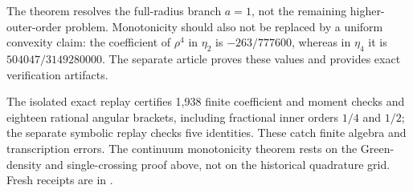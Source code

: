 \begin{remark}[Scope]
The theorem resolves the full-radius branch $a=1$, not the remaining
higher-outer-order problem. Monotonicity should also not be replaced
by a uniform convexity claim: the coefficient of $\rho^4$ in
$\eta_2$ is $-263/777600$, whereas in $\eta_4$ it is
$504047/3149280000$. The separate article proves these values and
provides exact verification artifacts.
\end{remark}

The isolated exact replay certifies 1,938 finite coefficient and moment
checks and eighteen rational angular brackets, including fractional inner
orders $1/4$ and $1/2$; the separate symbolic replay checks five identities.
These catch finite algebra and transcription errors. The continuum
monotonicity theorem rests on the Green-density and single-crossing proof
above, not on the historical quadrature grid. Fresh receipts are in
.
